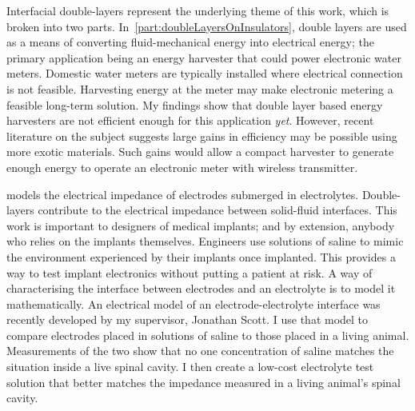   Interfacial double-layers represent the underlying theme of this work, which is broken into two parts.
  In~\cref{part:doubleLayersOnInsulators}, double layers are used as a means of converting fluid-mechanical energy into electrical energy; the primary application being an energy harvester that could power electronic water meters.
  Domestic water meters are typically installed where electrical connection is not feasible.
  Harvesting energy at the meter may make electronic metering a feasible long-term solution.
  My findings show that double layer based energy harvesters are not efficient enough for this application \emph{yet}.
  However, recent literature on the subject suggests large gains in efficiency may be possible using more exotic materials.
  Such gains would allow a compact harvester to generate enough energy to operate an electronic meter with wireless transmitter.

   models the electrical impedance of electrodes submerged in electrolytes.
  Double-layers contribute to the electrical impedance between solid-fluid interfaces.
  This work is important to designers of medical implants; and by extension, anybody who relies on the implants themselves.
  Engineers use solutions of saline to mimic the environment experienced by their implants once implanted.
  This provides a way to test implant electronics without putting a patient at risk.
  A way of characterising the interface between electrodes and an electrolyte is to model it mathematically.
  An electrical model of an electrode-electrolyte interface was recently developed by my supervisor, Jonathan Scott.
  I use that model to compare electrodes placed in solutions of saline to those placed in a living animal.
  Measurements of the two show that no one concentration of saline matches the situation inside a live spinal cavity.
  I then create a low-cost electrolyte test solution that better matches the impedance measured in a living animal's spinal cavity.



